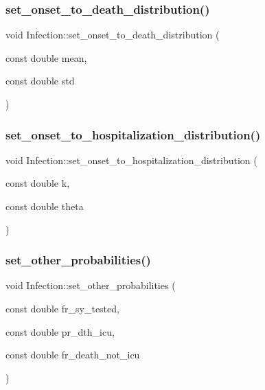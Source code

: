\subsubsection{\texorpdfstring{set\+\_\+onset\+\_\+to\+\_\+death\+\_\+distribution()}{set\_onset\_to\_death\_distribution()}}
{\footnotesize\ttfamily void Infection\+::set\+\_\+onset\+\_\+to\+\_\+death\+\_\+distribution (\begin{DoxyParamCaption}\item[{const double}]{mean,  }\item[{const double}]{std }\end{DoxyParamCaption})\hspace{0.3cm}{\ttfamily [inline]}}

\mbox{\label{classInfection_a06f93f2417379896f598b792e9af83a5}} 
\subsubsection{\texorpdfstring{set\+\_\+onset\+\_\+to\+\_\+hospitalization\+\_\+distribution()}{set\_onset\_to\_hospitalization\_distribution()}}
{\footnotesize\ttfamily void Infection\+::set\+\_\+onset\+\_\+to\+\_\+hospitalization\+\_\+distribution (\begin{DoxyParamCaption}\item[{const double}]{k,  }\item[{const double}]{theta }\end{DoxyParamCaption})\hspace{0.3cm}{\ttfamily [inline]}}

\mbox{\label{classInfection_a5515c6bbd87c7a3f5d0845e5454aa3fe}} 
\subsubsection{\texorpdfstring{set\+\_\+other\+\_\+probabilities()}{set\_other\_probabilities()}}
{\footnotesize\ttfamily void Infection\+::set\+\_\+other\+\_\+probabilities (\begin{DoxyParamCaption}\item[{const double}]{fr\+\_\+sy\+\_\+tested,  }\item[{const double}]{pr\+\_\+dth\+\_\+icu,  }\item[{const double}]{fr\+\_\+death\+\_\+not\+\_\+icu }\end{DoxyParamCaption})\hspace{0.3cm}{\ttfamily [inline]}}



